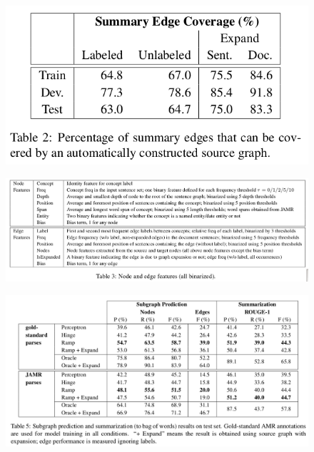 \documentclass[xcolor={table}]{beamer}
\begin{document}
\begin{frame}{\cite{liu2015toward}}
\begin{figure}[h]
\centering
\includegraphics[scale=.25]{images/table2-liu15} \\
\end{figure}
\end{frame}

\begin{frame}{\cite{liu2015toward}}
\begin{figure}[h]
\centering
\includegraphics[scale=.25]{images/table3-liu15} \\
\end{figure}
\end{frame}

\begin{frame}{\cite{liu2015toward}}
\begin{figure}[h]
\centering
\includegraphics[scale=.25]{images/table5-liu15} \\
\end{figure}
\end{frame}
\end{document}
